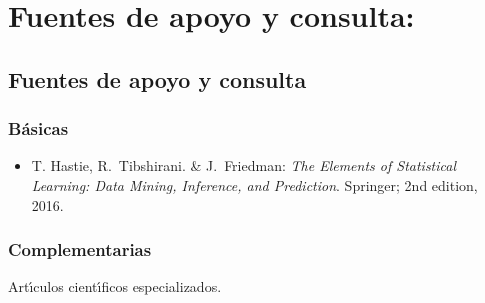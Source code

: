 \documentclass[10 pt]{article}
\begin{document}
\section{Fuentes de apoyo y consulta:}
\subsection{Fuentes de apoyo y consulta}
\subsubsection{B\'{a}sicas}

\begin{itemize}[itemsep=0em]

  
\item{T. {\sc Hastie}, R.\ {\sc Tibshirani}. \& J.\ {\sc Friedman}: {\em
      The Elements of Statistical Learning: Data Mining, Inference,
      and Prediction}. Springer; 2nd edition, 2016.}
  
\end{itemize}

\subsubsection{Complementarias}

Art\'{\i}culos cient\'{\i}ficos especializados.

\label{final} %


\end{document}

